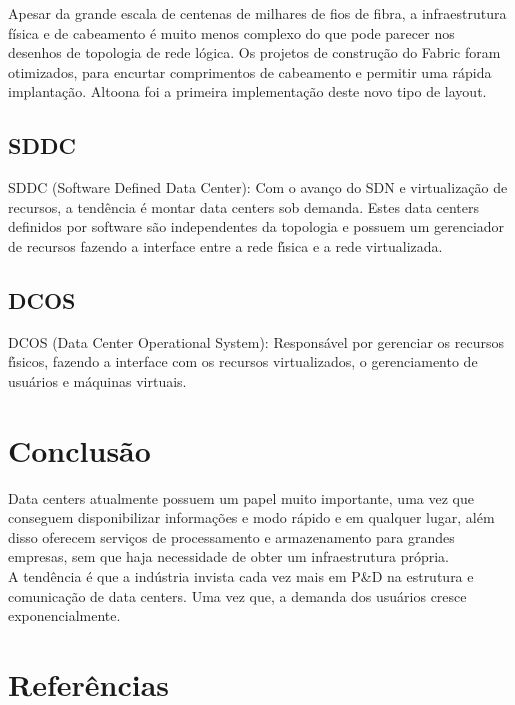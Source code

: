 \documentclass[12pt,a4paper]{report}
\begin{document}
Apesar da grande escala de centenas de milhares de fios de fibra, a infraestrutura física 
e de cabeamento é muito menos complexo do que pode parecer nos desenhos de topologia de rede lógica. 
Os projetos de construção do Fabric foram otimizados, para encurtar comprimentos de cabeamento 
e permitir uma rápida implantação. Altoona foi a primeira implementação deste novo tipo de layout.

\section{SDDC}

SDDC (Software Defined Data Center): Com o avanço do SDN e virtualização de recursos, a
tendência é montar data centers sob demanda. Estes data centers definidos por software são
independentes da topologia e possuem um gerenciador de recursos fazendo a interface entre a
rede fı́sica e a rede virtualizada.

\section{DCOS}

DCOS (Data Center Operational System): Responsável por gerenciar os recursos fı́sicos,
fazendo a interface com os recursos virtualizados, o gerenciamento de usuários e máquinas
virtuais.

\chapter{Conclusão}

Data centers atualmente possuem um papel muito importante, uma vez que conseguem disponibilizar informações e modo rápido e em qualquer lugar, além disso oferecem serviços de processamento e armazenamento para grandes empresas, sem que haja necessidade de obter um infraestrutura própria.\\

A tendência é que a indústria invista cada vez mais em P&D na estrutura e comunicação de data centers. Uma vez que, a demanda dos usuários cresce exponencialmente.\\

\chapter{Referências}
\end{document}
